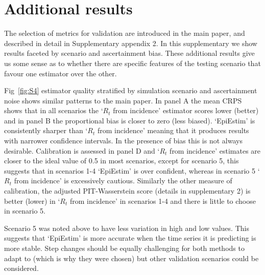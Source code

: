 \documentclass[a4paper, 12pt, twoside]{article}
\let\Oldsection\section
\renewcommand{\section}{\FloatBarrier\Oldsection}
\begin{document}
\clearpage

\section{Additional results}

The selection of metrics for validation are introduced in the main paper, and described in detail in Supplementary appendix 2. In this supplementary we show results faceted by scenario and ascertainment bias. These additional results give us some sense as to whether there are specific features of the testing scenario that favour one estimator over the other.

Fig~\ref{fig:S4} estimator quality stratified by simulation scenario and ascertainment noise shows similar patterns to the main paper. In panel A the mean CRPS shows that in all scenarios the `$R_t$ from incidence' estimator scores lower (better) and in panel B the proportional bias is closer to zero (less biased). `EpiEstim' is consistently sharper than `$R_t$ from incidence' meaning that it produces results with narrower confidence intervals. In the presence of bias this is not always desirable. Calibration is assessed in panel D and `$R_t$ from incidence' estimates are closer to the ideal value of 0.5 in most scenarios, except for scenario 5, this suggests that in scenarios 1-4 `EpiEstim' is over confident, whereas in scenario 5 `$R_t$ from incidence' is excessively cautious. Similarly the other measure of calibration, the adjusted PIT-Wasserstein score (details in supplementary 2) is better (lower) in `$R_t$ from incidence' in scenarios 1-4 and there is little to choose in scenario 5.

Scenario 5 was noted above to have less variation in high and low values. This suggests that `EpiEstim' is more accurate when the time series it is predicting is more stable. Step changes should be equally challenging for both methods to adapt to (which is why they were chosen) but other validation scenarios could be considered.
\end{document}
